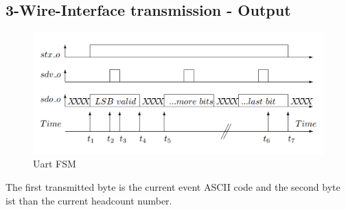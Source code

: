 \documentclass[12pt,a4 paper] {report}
\begin{document}
\subsection*{3-Wire-Interface transmission - Output}
\begin{figure}[h]
	\centering	
	\includegraphics[scale=0.4]{../png/3wireinterface.png}
	\caption{Uart FSM}
\end{figure}

The first transmitted byte is the current event ASCII code and the second byte ist than the current headcount number.

\newpage
\end{document}
